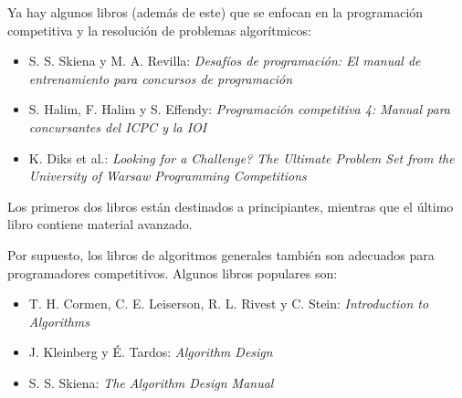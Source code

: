 Ya hay algunos libros (además de este) que
se enfocan en la programación competitiva y la
resolución de problemas algorítmicos:

\begin{itemize}
    \item S. S. Skiena y M. A. Revilla:
          \emph{Desafíos de programación: El manual de entrenamiento para concursos de programación} \cite{ski20}
    \item S. Halim, F. Halim y S. Effendy:
          \emph{Programación competitiva 4: Manual para concursantes del ICPC y la IOI} \cite{hal21}
    \item K. Diks et al.:
          \emph{Looking for a Challenge? The Ultimate Problem Set from
              the University of Warsaw Programming Competitions} \cite{dik12}
\end{itemize}

Los primeros dos libros están destinados a principiantes,
mientras que el último libro contiene material avanzado.

Por supuesto, los libros de algoritmos generales también son adecuados para
programadores competitivos.
Algunos libros populares son:

\begin{itemize}
    \item T. H. Cormen, C. E. Leiserson, R. L. Rivest y C. Stein:
          \emph{Introduction to Algorithms} \cite{cor09}
    \item J. Kleinberg y É. Tardos:
          \emph{Algorithm Design} \cite{kle05}
    \item S. S. Skiena:
          \emph{The Algorithm Design Manual} \cite{ski08}
\end{itemize}


